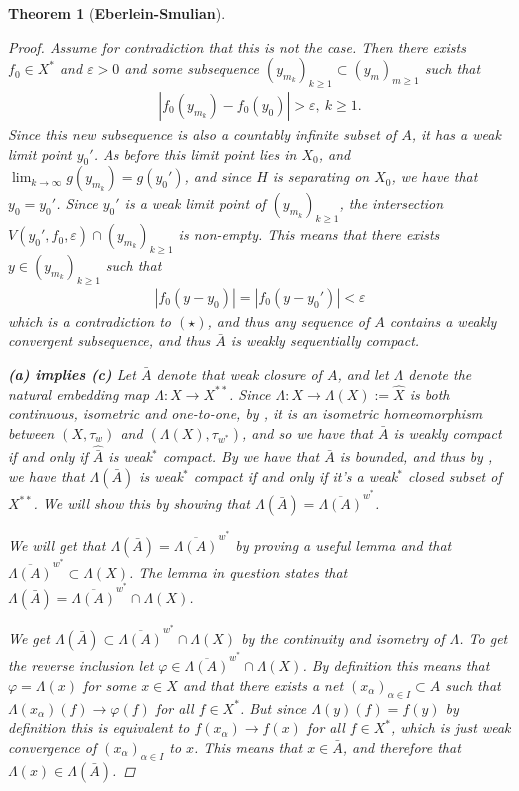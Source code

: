 \documentclass[10pt,twoside,openany,final]{memoir}
\theoremstyle{break}
\newtheorem{theorem}[section]{Theorem}
\theoremstyle{Break}
\begin{document}
\begin{theorem}[\bfseries{Eberlein-Smulian}]
\begin{proof}
    Assume for contradiction that this is not the case.
    Then there exists $f_0\in X^*$ and $\varepsilon >0$ and some subsequence $(y_{m_k})_{k\geq 1}\subset (y_m)_{m\geq 1}$ such that
    \begin{align*}
        |f_0(y_{m_k})-f_{0}(y_0)|>\varepsilon, \ k\geq 1. \tag{$\star$}
    \end{align*}
    Since this new subsequence is also a countably infinite subset of $A$, it has a weak limit point $y_0'$.
    As before this limit point lies in $X_0$, and $\lim_{k \to \infty} g(y_{m_k}) = g(y_0')$, and since $H$ is separating on $X_{0}$, we have that $y_{0}=y_{0}'$.
    Since $y_0'$ is a weak limit point of $(y_{m_k})_{k\geq 1}$, the intersection $V(y_0',f_0,\varepsilon)\cap (y_{m_k})_{k\geq 1}$ is non-empty.
    This means that there exists $y\in (y_{m_k})_{k\geq 1}$ such that 
    \begin{align*}
    |f_{0}(y-y_{0})|=|f_{0}(y-y_0')|<\varepsilon
	\end{align*}     
	which is a contradiction to $(\star)$, and thus any sequence of $A$ contains a weakly convergent subsequence, and thus $\bar{A}$ is weakly sequentially compact.
    
\textbf{(a) implies (c)}
Let $\bar{A}$ denote that weak closure of $A$, and let $\Lambda$ denote the natural embedding map $\Lambda:X \to X^{**}$. Since $\Lambda:X \to \Lambda(X):=\hat{X}$ is both continuous, isometric and one-to-one, by , it is an isometric homeomorphism between $(X,\tau_{w})$ and $(\Lambda(X),\tau_{w^*})$, and so we have that $\bar{A}$ is weakly compact if and only if $\hat{\bar{A}}$ is weak$^*$ compact. By  we have that $\bar{A}$ is bounded, and thus by , we have that $\Lambda(\bar{A})$ is weak$^*$ compact if and only if it's a weak$^*$ closed subset of $X^{**}$. We will show this by showing that $\Lambda(\bar{A})=\overline{\Lambda(A)}^{w^*}$.
    
\noindent
We will get that $\Lambda(\bar{A})=\overline{\Lambda(A)}^{w^*}$ by proving a useful lemma and that $\overline{\Lambda(A)}^{w^*} \subset \Lambda(X)$.
The lemma in question states that $\Lambda(\bar{A})=\overline{\Lambda(A)}^{w^*} \cap \Lambda(X)$.

We get $\Lambda(\bar{A})\subset \overline{\Lambda(A)}^{w^*} \cap \Lambda(X)$ by the continuity and isometry of $\Lambda$.
To get the reverse inclusion let $\varphi \in \overline{\Lambda(A)}^{w^*} \cap \Lambda(X)$.
By definition this means that $\varphi=\Lambda(x)$ for some $x\in X$ and that there exists a net $(x_{\alpha})_{\alpha \in I}\subset A$ such that $\Lambda(x_{\alpha})(f) \to \varphi(f)$ for all $f\in X^*$.
But since $\Lambda(y)(f)=f(y)$ by definition this is equivalent to $f(x_{\alpha})\to f(x)$ for all $f\in X^*$, which is just weak convergence of $(x_{\alpha})_{\alpha \in I}$ to $x$.
This means that $x\in \bar{A}$, and therefore that $\Lambda(x)\in \Lambda(\bar{A})$.



\end{proof}
\end{theorem}
\end{document}
